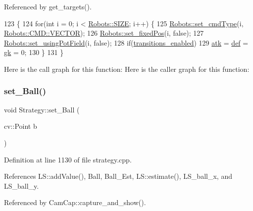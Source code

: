 Referenced by get\+\_\+targets().


\begin{DoxyCode}
123                            \{
124     \textcolor{keywordflow}{for}(\textcolor{keywordtype}{int} i = 0; i < \hyperlink{class_robots_ae9df2f1d345ad6740f0459956cdd4712}{Robots::SIZE}; i++) \{
125         \hyperlink{class_robots_a748870113b457e47bccaf4cd329f4378}{Robots::set\_cmdType}(i, \hyperlink{serial_w_8hpp_ac6e89954deaa373db52a91ac6db50884}{Robots::CMD::VECTOR});
126         \hyperlink{class_robots_a427266e3332ab91bb3a78b5fb61a6c2c}{Robots::set\_fixedPos}(i, \textcolor{keyword}{false});
127         \hyperlink{class_robots_a51288c53411bda98c5f9cd05f6ef2a82}{Robots::set\_usingPotField}(i, \textcolor{keyword}{false});
128         \textcolor{keywordflow}{if}(\hyperlink{class_strategy_a6d59806a95ef79a25d30c4f139c94671}{transitions\_enabled})
129             \hyperlink{class_strategy_af06cfb5e28b7a30cfaa312c7a1c051b1}{atk} = \hyperlink{class_strategy_ade11a007d9479832ddc5e69169e23692}{def} = \hyperlink{class_strategy_a7efb4f780b78ee593649340a7f948c36}{gk} = 0;
130     \}
131 \}
\end{DoxyCode}
Here is the call graph for this function\+:
Here is the caller graph for this function\+:
\mbox{\label{class_strategy_a7119e796ed0218f4e44418fea1efdf49}} 
\subsubsection{\texorpdfstring{set\+\_\+\+Ball()}{set\_Ball()}}
{\footnotesize\ttfamily void Strategy\+::set\+\_\+\+Ball (\begin{DoxyParamCaption}\item[{cv\+::\+Point}]{b }\end{DoxyParamCaption})}



Definition at line 1130 of file strategy.\+cpp.



References L\+S\+::add\+Value(), Ball, Ball\+\_\+\+Est, L\+S\+::estimate(), L\+S\+\_\+ball\+\_\+x, and L\+S\+\_\+ball\+\_\+y.



Referenced by Cam\+Cap\+::capture\+\_\+and\+\_\+show().


